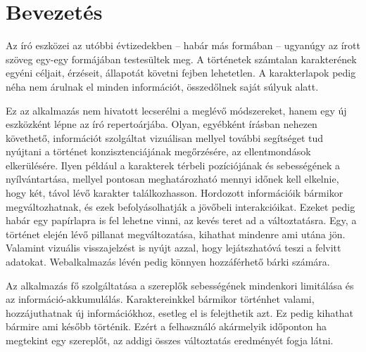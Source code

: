 \chapter{Bevezetés}
\label{ch:intro}

Az író eszközei az utóbbi évtizedekben -- habár más formában -- ugyanúgy az írott szöveg egy-egy formájában testesültek meg. A történetek számtalan karakterének egyéni céljait, érzéseit, állapotát követni fejben lehetetlen. A karakterlapok pedig néha nem árulnak el minden információt, összedőlnek saját súlyuk alatt.

Ez az alkalmazás nem hivatott lecserélni a meglévő módszereket, hanem egy új eszközként lépne az író repertoárjába. Olyan, egyébként írásban nehezen követhető, információt szolgáltat vizuálisan mellyel további segítséget tud nyújtani a történet konzisztenciájának megőrzésére, az ellentmondások elkerülésére. Ilyen például a karakterek térbeli pozíciójának és sebességének a nyílvántartása, mellyel pontosan meghatározható mennyi időnek kell elkelnie, hogy két, távol lévő karakter találkozhasson. Hordozott információik bármikor megváltozhatnak, és ezek befolyásolhatják a jövőbeli interakcióikat. Ezeket pedig habár egy papírlapra is fel lehetne vinni, az kevés teret ad a változtatásra. Egy, a történet elején lévő pillanat megváltozatása, kihathat mindenre ami utána jön. Valamint vizuális visszajelzést is nyújt azzal, hogy lejátszhatóvá teszi a felvitt adatokat. Webalkalmazás lévén pedig könnyen hozzáférhető bárki számára.

Az alkalmazás fő szolgáltatása a szereplők sebességének mindenkori limitálása és az információ-akkumulálás. Karaktereinkkel bármikor történhet valami, hozzájuthatnak új információkhoz, esetleg el is felejthetik azt. Ez pedig kihathat bármire ami később történik. Ezért a felhasználó akármelyik időponton ha megtekint egy szereplőt, az addigi összes változtatás eredményét fogja látni.
